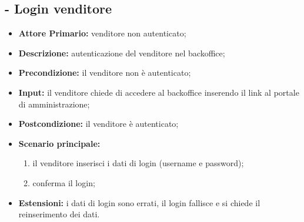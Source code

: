 \subsection{ - Login venditore}
\begin{itemize}
    \item \textbf{Attore Primario:} venditore non autenticato;
    \item \textbf{Descrizione:} autenticazione del venditore nel backoffice;
    \item \textbf{Precondizione:} il venditore non è autenticato;
    \item \textbf{Input:} il venditore chiede di accedere al backoffice inserendo il link al portale di amministrazione;
    \item \textbf{Postcondizione:} il venditore è autenticato;
    \item \textbf{Scenario principale:}
          \begin{enumerate}
              \item il venditore inserisci i dati di login (username e password);
              \item conferma il login;
          \end{enumerate}
    \item \textbf{Estensioni:} i dati di login sono errati, il login fallisce e si chiede il reinserimento dei dati.
\end{itemize}